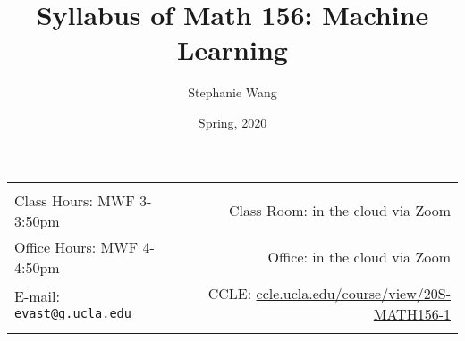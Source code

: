 \documentclass[11pt]{article}
\title{Syllabus of Math 156: Machine Learning}
\author{Stephanie Wang}
\date{Spring, 2020}
\begin{document}
\maketitle

\begin{tabular*}{.92\textwidth}{@{\extracolsep{\fill}}lr}


\hline
 & \\
 Class Hours: MWF 3-3:50pm & Class Room: in the cloud via Zoom \\
 Office Hours: MWF 4-4:50pm & Office: in the cloud via Zoom\\
 E-mail: \texttt{evast@g.ucla.edu} & CCLE: \href{https://ccle.ucla.edu/course/view/20S-MATH156-1}{ccle.ucla.edu/course/view/20S-MATH156-1}\\ 
 & \\
\hline
\end{tabular*}
\vspace{5 mm}

\end{document}
